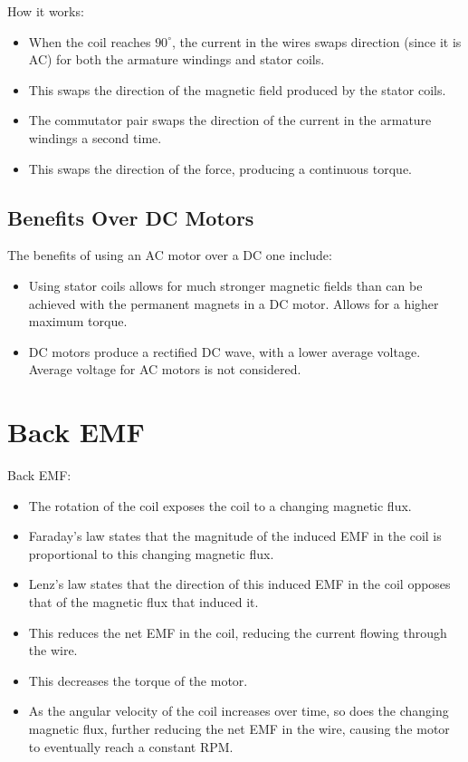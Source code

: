 \documentclass[a4paper,11pt]{article}
\begin{document}
How it works:

\begin{itemize}
\item When the coil reaches $90^\circ$, the current in the wires swaps direction
	(since it is AC) for both the armature windings and stator coils.
\item This swaps the direction of the magnetic field produced by the stator
	coils.
\item The commutator pair swaps the direction of the current in the armature
	windings a second time.
\item This swaps the direction of the force, producing a continuous torque.
\end{itemize}


\subsection{Benefits Over DC Motors}

The benefits of using an AC motor over a DC one include:

\begin{itemize}
\item Using stator coils allows for much stronger magnetic fields than can be
	achieved with the permanent magnets in a DC motor. Allows for a higher
	maximum torque.
\item DC motors produce a rectified DC wave, with a lower average voltage.
	Average voltage for AC motors is not considered.
\end{itemize}




\section{Back EMF}

Back EMF:

\begin{itemize}
\item The rotation of the coil exposes the coil to a changing magnetic flux.
\item Faraday's law states that the magnitude of the induced EMF in the coil
	is proportional to this changing magnetic flux.
\item Lenz's law states that the direction of this induced EMF in the coil
	opposes that of the magnetic flux that induced it.
\item This reduces the net EMF in the coil, reducing the current flowing through
	the wire.
\item This decreases the torque of the motor.
\item As the angular velocity of the coil increases over time, so does the
	changing magnetic flux, further reducing the net EMF in the wire, causing
	the motor to eventually reach a constant RPM.
\end{itemize}
\end{document}
